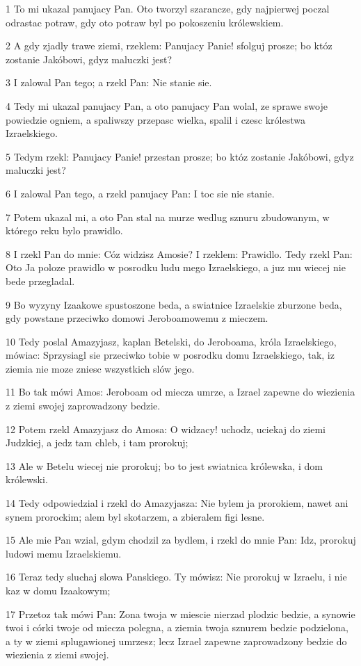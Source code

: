 \par 1 To mi ukazal panujacy Pan. Oto tworzyl szarancze, gdy najpierwej poczal odrastac potraw, gdy oto potraw byl po pokoszeniu królewskiem.
\par 2 A gdy zjadly trawe ziemi, rzeklem: Panujacy Panie! sfolguj prosze; bo któz zostanie Jakóbowi, gdyz maluczki jest?
\par 3 I zalowal Pan tego; a rzekl Pan: Nie stanie sie.
\par 4 Tedy mi ukazal panujacy Pan, a oto panujacy Pan wolal, ze sprawe swoje powiedzie ogniem, a spaliwszy przepasc wielka, spalil i czesc królestwa Izraelskiego.
\par 5 Tedym rzekl: Panujacy Panie! przestan prosze; bo któz zostanie Jakóbowi, gdyz maluczki jest?
\par 6 I zalowal Pan tego, a rzekl panujacy Pan: I toc sie nie stanie.
\par 7 Potem ukazal mi, a oto Pan stal na murze wedlug sznuru zbudowanym, w którego reku bylo prawidlo.
\par 8 I rzekl Pan do mnie: Cóz widzisz Amosie? I rzeklem: Prawidlo. Tedy rzekl Pan: Oto Ja poloze prawidlo w posrodku ludu mego Izraelskiego, a juz mu wiecej nie bede przegladal.
\par 9 Bo wyzyny Izaakowe spustoszone beda, a swiatnice Izraelskie zburzone beda, gdy powstane przeciwko domowi Jeroboamowemu z mieczem.
\par 10 Tedy poslal Amazyjasz, kaplan Betelski, do Jeroboama, króla Izraelskiego, mówiac: Sprzysiagl sie przeciwko tobie w posrodku domu Izraelskiego, tak, iz ziemia nie moze zniesc wszystkich slów jego.
\par 11 Bo tak mówi Amos: Jeroboam od miecza umrze, a Izrael zapewne do wiezienia z ziemi swojej zaprowadzony bedzie.
\par 12 Potem rzekl Amazyjasz do Amosa: O widzacy! uchodz, uciekaj do ziemi Judzkiej, a jedz tam chleb, i tam prorokuj;
\par 13 Ale w Betelu wiecej nie prorokuj; bo to jest swiatnica królewska, i dom królewski.
\par 14 Tedy odpowiedzial i rzekl do Amazyjasza: Nie bylem ja prorokiem, nawet ani synem prorockim; alem byl skotarzem, a zbieralem figi lesne.
\par 15 Ale mie Pan wzial, gdym chodzil za bydlem, i rzekl do mnie Pan: Idz, prorokuj ludowi memu Izraelskiemu.
\par 16 Teraz tedy sluchaj slowa Panskiego. Ty mówisz: Nie prorokuj w Izraelu, i nie kaz w domu Izaakowym;
\par 17 Przetoz tak mówi Pan: Zona twoja w miescie nierzad plodzic bedzie, a synowie twoi i córki twoje od miecza polegna, a ziemia twoja sznurem bedzie podzielona, a ty w ziemi splugawionej umrzesz; lecz Izrael zapewne zaprowadzony bedzie do wiezienia z ziemi swojej.

